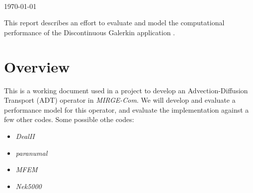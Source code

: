 \documentclass[11pt]{article}
\begin{document}
\color{mainTextColor}

\thispagestyle{empty}

\vspace*{1.0in}


\begin{center}

  {\Large {}}\\

  \bigskip


  {\huge {}}\\
  \bigskip

\bigskip

\\

\bigskip

  {\today}\\


\vspace*{1.0in}

\begin{minipage}{0.8\textwidth}
This report describes an effort to evaluate and model the computational performance of the Discontinuous Galerkin application \ceesdcode{}.
\end{minipage}

\end{center}
\vfill

\newpage
\setcounter{page}{1}



\section{Overview}
This is a working document used in a project to develop an Advection-Diffusion Transport (ADT) operator in \textit{MIRGE-Com}.  We will develop and evaluate a performance model for this operator, and evaluate the implementation against a few other codes. Some possible othe codes:
\begin{itemize}
\item \textit{DealII}
\item \textit{paranumal}
\item \textit{MFEM}
\item \textit{Nek5000}
\end{itemize}
\end{document}
